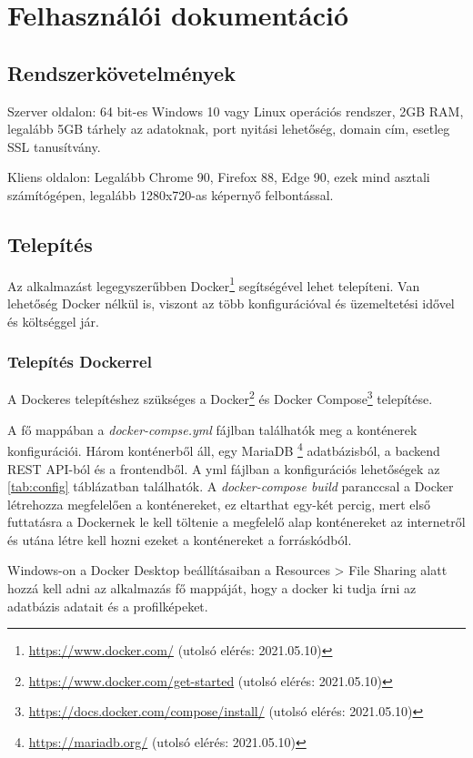 \chapter{Felhasználói dokumentáció} %
\label{ch:user}

\section{Rendszerkövetelmények}
Szerver oldalon: 64 bit-es Windows 10 vagy Linux operációs rendszer, 2GB RAM, legalább 5GB tárhely az adatoknak, port nyitási lehetőség, domain cím, esetleg SSL tanusítvány.

Kliens oldalon: Legalább Chrome 90, Firefox 88, Edge 90, ezek mind asztali számítógépen, legalább 1280x720-as képernyő felbontással.

\section{Telepítés}

Az alkalmazást legegyszerűbben Docker\footnote{\url{https://www.docker.com/} (utolsó elérés: 2021.05.10)} segítségével lehet telepíteni. Van lehetőség Docker nélkül is, viszont az több konfigurációval és üzemeltetési idővel és költséggel jár.

\subsection{Telepítés Dockerrel}

A Dockeres telepítéshez szükséges a Docker\footnote{\url{https://www.docker.com/get-started} (utolsó elérés: 2021.05.10)} és Docker Compose\footnote{\url{https://docs.docker.com/compose/install/} (utolsó elérés: 2021.05.10)} telepítése.

A fő mappában a \textit{docker-compse.yml} fájlban találhatók meg a konténerek konfigurációi. Három konténerből áll, egy MariaDB \footnote{\url{https://mariadb.org/} (utolsó elérés: 2021.05.10)} adatbázisból, a backend REST API-ból és a frontendből.
A yml fájlban a konfigurációs lehetőségek az \ref{tab:config} táblázatban találhatók. A \textit{docker-compose build} paranccsal a Docker létrehozza megfelelően a konténereket, ez eltarthat egy-két percig, mert első futtatásra a Dockernek le kell töltenie a megfelelő alap konténereket az internetről és utána létre kell hozni ezeket a konténereket a forráskódból.

Windows-on a Docker Desktop beállításaiban a Resources > File Sharing alatt hozzá kell adni az alkalmazás fő mappáját, hogy a docker ki tudja írni az adatbázis adatait és a profilképeket.


